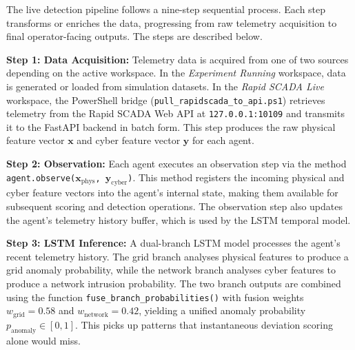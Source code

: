 The live detection pipeline follows a nine-step sequential process. Each step transforms or enriches the data, progressing from raw telemetry acquisition to final operator-facing outputs. The steps are described below.

\par \vspace{0.35cm}
\noindent
\textbf{Step 1: Data Acquisition:} Telemetry data is acquired from one of two sources depending on the active workspace. In the \textit{Experiment Running} workspace, data is generated or loaded from simulation datasets. In the \textit{Rapid SCADA Live} workspace, the PowerShell bridge (\mbox{\texttt{pull\_rapidscada\_to\_api.ps1}}) retrieves telemetry from the Rapid SCADA Web API at \texttt{127.0.0.1:10109} and transmits it to the FastAPI backend in batch form. This step produces the raw physical feature vector $\mathbf{x}$ and cyber feature vector $\mathbf{y}$ for each agent.

\par \vspace{0.35cm}
\noindent
\textbf{Step 2: Observation:} Each agent executes an observation step via the method \texttt{agent.observe($\mathbf{x}_{\text{phys}}$, $\mathbf{y}_{\text{cyber}}$)}. This method registers the incoming physical and cyber feature vectors into the agent's internal state, making them available for subsequent scoring and detection operations. The observation step also updates the agent's telemetry history buffer, which is used by the LSTM temporal model.

\par \vspace{0.35cm}
\noindent
\textbf{Step 3: LSTM Inference:} A dual-branch LSTM model processes the agent's recent telemetry history. The grid branch analyses physical features to produce a grid anomaly probability, while the network branch analyses cyber features to produce a network intrusion probability. The two branch outputs are combined using the function \mbox{\texttt{fuse\_branch\_probabilities()}} with fusion weights $w_{\text{grid}} = 0.58$ and $w_{\text{network}} = 0.42$, yielding a unified anomaly probability $p_{\text{anomaly}} \in [0,1]$. This picks up patterns that instantaneous deviation scoring alone would miss.

